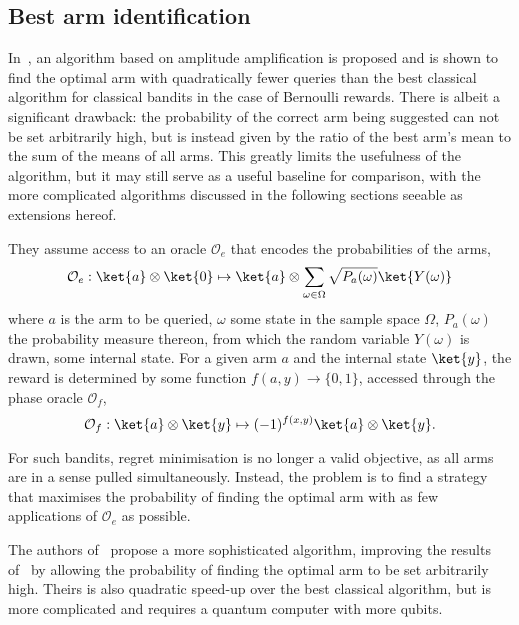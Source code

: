 \subsection{Best arm identification}
In~\autocite{casale2020}, an algorithm based on amplitude amplification is proposed and is shown to find the optimal arm with quadratically fewer queries than the best classical algorithm for classical bandits in the case of Bernoulli rewards.
There is albeit a significant drawback: the probability of the correct arm being suggested can not be set arbitrarily high, but is instead given by the ratio of the best arm's mean to the sum of the means of all arms.
This greatly limits the usefulness of the algorithm, but it may still serve as a useful baseline for comparison, with the more complicated algorithms discussed in the following sections seeable as extensions hereof.

They assume access to an oracle $\mathcal{O}_e$ that encodes the probabilities of the arms,
\begin{equation}
    \mathcal{O}_e: \ket{a} \otimes \ket{0} \mapsto \ket{a} \otimes \sum_{\omega \in \Omega} \sqrt{P_a(\omega)} \ket{Y(\omega)}
\end{equation}
where $a$ is the arm to be queried, $\omega$ some state in the sample space $\Omega$, $P_a(\omega)$ the probability measure thereon, from which the random variable $Y(\omega)$ is drawn, some internal state.
For a given arm $a$ and the internal state $\ket{y}$, the reward is determined by some function $f(a, y) \to \{0, 1\}$, accessed through the phase oracle $\mathcal{O}_f$,
\begin{equation}
    \mathcal{O}_f :  \ket{a}\otimes\ket{y} \mapsto (-1)^{f(x,y)} \ket{a}\otimes\ket{y}.
\end{equation}

For such bandits, regret minimisation is no longer a valid objective, as all arms are in a sense pulled simultaneously.
Instead, the problem is to find a strategy that maximises the probability of finding the optimal arm with as few applications of $\mathcal{O}_e$ as possible.

The authors of~\autocite{wang2021} propose a more sophisticated algorithm, improving the results of~\autocite{casale2020} by allowing the probability of finding the optimal arm to be set arbitrarily high.
Theirs is also quadratic speed-up over the best classical algorithm, but is more complicated and requires a quantum computer with more qubits.